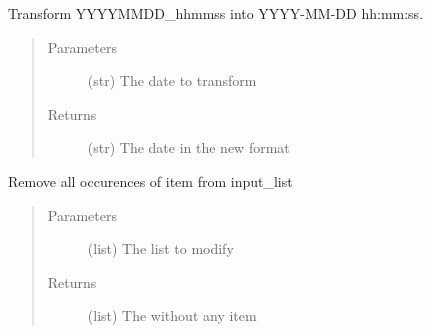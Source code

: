 \documentclass[a4paper,10pt,english]{sphinxmanual}
\begin{document}
\begin{fulllineitems}
\label{\detokenize{apidoc_src/src:src.utilsSat.parse_date}}
Transform YYYYMMDD\_hhmmss into YYYY-MM-DD hh:mm:ss.
\begin{quote}\begin{description}
\item[{Parameters}] \leavevmode
{} \textendash{} (str) The date to transform

\item[{Returns}] \leavevmode
(str) The date in the new format

\end{description}\end{quote}

\end{fulllineitems}


\begin{fulllineitems}
\label{\detokenize{apidoc_src/src:src.utilsSat.read_config_from_a_file}}
\end{fulllineitems}


\begin{fulllineitems}
\label{\detokenize{apidoc_src/src:src.utilsSat.red}}
\end{fulllineitems}


\begin{fulllineitems}
\label{\detokenize{apidoc_src/src:src.utilsSat.remove_item_from_list}}
Remove all occurences of item from input\_list
\begin{quote}\begin{description}
\item[{Parameters}] \leavevmode
{} \textendash{} (list) The list to modify

\item[{Returns}] \leavevmode
(list) The without any item

\end{description}\end{quote}

\end{fulllineitems}
\end{document}
